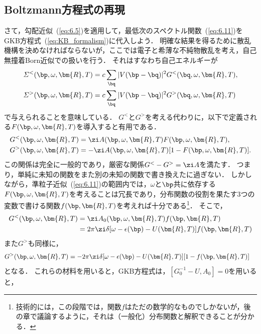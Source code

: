 \documentclass[a4paper,10pt]{jsarticle}
\begin{document}
\subsection{\label{sec:6.3}Boltzmann方程式の再現}
さて，勾配近似~(\ref{eq:6.5})を適用して，最低次のスペクトル関数~(\ref{eq:6.11})をGKB方程式~(\ref{eq:KB_formalism})に代入しよう．
明確な結果を得るために散乱機構を決めなければならないが，ここでは電子と希薄な不純物散乱を考え，自己無撞着Born近似での扱いを行う．
それはすなわち自己エネルギーが
\begin{align}
\varSigma^{<} (\bp, \omega, \bm{R}, T)
	& = c \sum_{\bq} | V (\bp - \bq) |^2 G^{<} (\bq, \omega, \bm{R}, T)
, \notag \\
\varSigma^{>} (\bp, \omega, \bm{R}, T)
	& = c \sum_{\bq} | V (\bp - \bq) |^2 G^{>} (\bq, \omega, \bm{R}, T)
\end{align}
で与えられることを意味している．
$G^{<}$と$G^{>}$を考える代わりに，以下で定義される$F (\bp, \omega, \bm{R}, T)$を導入すると有用である．
\begin{align}
G^{<} (\bp, \omega, \bm{R}, T)
	& = \zi A (\bp, \omega, \bm{R}, T) F (\bp, \omega, \bm{R}, T)
, \notag \\
G^{>} (\bp, \omega, \bm{R}, T)
	& = - \zi A (\bp, \omega, \bm{R}, T) [ 1 - F (\bp, \omega, \bm{R}, T) ]
.\end{align}
この関係は完全に一般的であり，厳密な関係$G^{<} - G^{>} = \zi A$を満たす．
つまり，単純に未知の関数をまた別の未知の関数で書き換えたに過ぎない．
しかしながら，準粒子近似~(\ref{eq:6.11})の範囲内では，$\omega$と$\bp$共に依存する$F (\bp, \omega, \bm{R}, T)$を考えることは冗長であり，分布関数の役割を果たす3つの変数で書ける関数$f (\bp, \bm{R}, T)$を考えれば十分である\footnote{技術的には，この段階では，関数$f$はただの数学的なものでしかないが，後の章で議論するように，それは（一般化）分布関数と解釈できることが分かる．}．
そこで，
\begin{align}
G^{<} (\bp, \omega, \bm{R}, T)
	& = \zi A_0 (\bp, \omega, \bm{R}, T) f (\bp, \bm{R}, T)
\notag \\
	& = 2 \pi \zi \delta [ \omega - \epsilon (\bp) - U (\bm{R}, T) ] f (\bp, \bm{R}, T)
\end{align}
また$G^{>}$も同様に，
\begin{align*}
G^{>} (\bp, \omega, \bm{R}, T)
	& = - 2 \pi \zi \delta [ \omega - \epsilon (\bp) - U (\bm{R}, T) ] [ 1 - f (\bp, \bm{R}, T) ]
\end{align*}
となる．
これらの材料を用いると，GKB方程式は，$[G_0^{-1} - U, A_0] = 0$を用いると，
\end{document}
